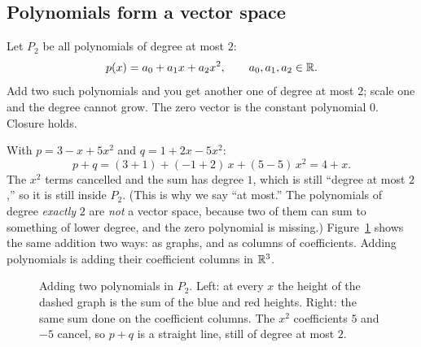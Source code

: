 \subsection{Polynomials form a vector space}

Let $P_2$ be all polynomials of degree at most $2$:
\[
p(x) = a_0 + a_1 x + a_2 x^2, \qquad a_0,a_1,a_2 \in \mathbb{R}.
\]
Add two such polynomials and you get another one of degree at most $2$; scale one and the
degree cannot grow. The zero vector is the constant polynomial $0$. Closure holds.

\begin{example}\label{ch11:poly-space}
With $p = 3 - x + 5x^2$ and $q = 1 + 2x - 5x^2$:
\[
p + q = (3+1) + (-1+2)\,x + (5-5)\,x^2 = 4 + x.
\]
The $x^2$ terms cancelled and the sum has degree $1$, which is still ``degree at most
$2$,'' so it is still inside $P_2$. (This is why we say ``at most.'' The polynomials of
degree \emph{exactly} $2$ are \emph{not} a vector space, because two of them can sum to
something of lower degree, and the zero polynomial is missing.)
Figure~\ref{ch11:fig-polyadd} shows the same addition two ways: as graphs, and as
columns of coefficients. Adding polynomials is adding their coefficient columns in $\mathbb{R}^3$.
\end{example}

\begin{figure}[htbp]
\centering
{}
\caption{Adding two polynomials in $P_2$. Left: at every $x$ the height of the dashed
graph is the sum of the blue and red heights. Right: the same sum done on the coefficient
columns. The $x^2$ coefficients $5$ and $-5$ cancel, so $p+q$ is a straight line, still of
degree at most $2$.}
\label{ch11:fig-polyadd}
\end{figure}

